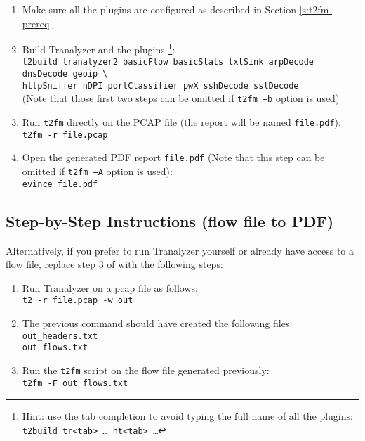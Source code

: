 \documentclass[documentation]{subfiles}
\begin{document}
\begin{enumerate}
    \item Make sure all the plugins are configured as described in Section \ref{s:t2fm-prereq}
    \item Build Tranalyzer and the plugins
        \footnote{Hint: use the tab completion to avoid typing the full name of all the plugins: {\tt t2build tr<tab>~\ldots~ht<tab>~\ldots}}:\\
        {\tt t2build tranalyzer2 basicFlow basicStats txtSink arpDecode dnsDecode geoip \textbackslash{}}\\
        {\tt httpSniffer nDPI portClassifier pwX sshDecode sslDecode}\\
        (Note that those first two steps can be omitted if {\tt t2fm --b} option is used)
    \item Run {\tt t2fm} directly on the PCAP file (the report will be named {\tt file.pdf}):\\
        {\tt t2fm -r file.pcap}
    \item Open the generated PDF report {\tt file.pdf}
        (Note that this step can be omitted if {\tt t2fm --A} option is used):\\
        {\tt evince file.pdf}
\end{enumerate}

\subsection{Step-by-Step Instructions (flow file to PDF)}
Alternatively, if you prefer to run Tranalyzer yourself or already have access to a flow file, replace step 3 of  with the following steps:
\begin{enumerate}
    \item Run Tranalyzer on a pcap file as follows:\\
        {\tt t2 -r file.pcap -w out}
    \item The previous command should have created the following files:\\
        {\tt out\_headers.txt\\out\_flows.txt}
    \item Run the {\tt t2fm} script on the flow file generated previously:\\
        {\tt t2fm -F out\_flows.txt}
\end{enumerate}
\end{document}
